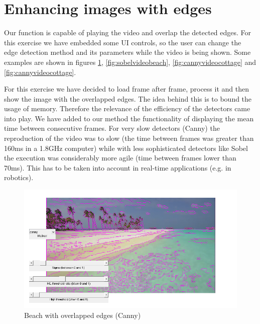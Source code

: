 \section{Enhancing images with edges}
\label{sec:enhancing}

Our function is capable of playing the video and overlap the detected edges.
For this exercise we have embedded some UI controls, so the user can change the edge
detection method and its parameters while the video is being shown. Some examples are
shown in figures \ref{fig:cannyvideobeach}, \ref{fig:sobelvideobeach},
\ref{fig:cannyvideocottage} and \ref{fig:cannyvideocottage}.

For this exercise we have decided to load frame after frame, process it and then
show the image with the overlapped edges. The idea behind this is to bound the
usage of memory. Therefore the relevance of the efficiency of the detectors came
into play. We have added to our method the functionality of displaying the mean time
between consecutive frames. For very slow detectors (Canny) the reproduction of the video was
to slow (the time between frames was greater than 160ms in a 1.8GHz computer) while with
less sophisticated detectors like Sobel the execution was considerably more agile (time
between frames lower than 70ms). This has to be taken into account in real-time applications
(e.g. in robotics).

\begin{figure}[!hbt]
  \includegraphics[width=\textwidth]{./img/ex2/frame_canny_1.png}
  \caption{Beach with overlapped edges (Canny)}
  \label{fig:cannyvideobeach}
\end{figure}

